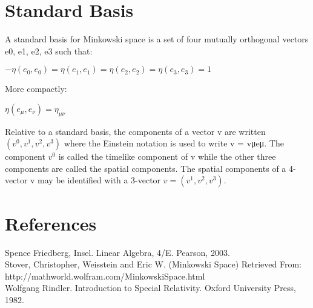 \documentclass[11]{article}
\begin{document}
\section{Standard Basis}
A standard basis for Minkowski space is a set of four mutually orthogonal vectors { e0, e1, e2, e3 } such that:\\
\begin{center}
$-\eta(e_0,e_0)=\eta(e_1,e_1)=\eta(e_2,e_2)=\eta(e_3,e_3)=1$
\end{center}
More compactly:
\begin{center}
$\eta(e_{\mu},e_{\nu})=\eta_{\mu \nu}$
\end{center} 

Relative to a standard basis, the components of a vector v are written $(v^0, v^1, v^2, v^3)$ where the Einstein notation is used to write v = vμeμ. The component $v^0$ is called the timelike component of v while the other three components are called the spatial components. The spatial components of a 4-vector v may be identified with a 3-vector $v = (v^1, v^2, v^3)$.

\section{References}

Spence Friedberg, Insel. Linear Algebra, 4/E. Pearson, 2003.\\

\noindent Stover, Christopher, Weisstein and Eric W. (Minkowski Space) Retrieved From: http://mathworld.wolfram.com/MinkowskiSpace.html\\

\noindent Wolfgang Rindler. Introduction to Special Relativity. Oxford University Press, 1982.
\end{document}
